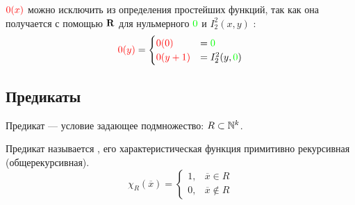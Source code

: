 \begin{note}
	$ {\color{red}0(x)}$ можно исключить из определения простейших функций, так как она получается с помощью $ \mathbf{R}$ для нульмерного $ {\color{green}0}$ и $ I^{2}_{2} (x, y)$ :
	\[
		{\color{red}0(y)} = 
		\begin{cases}
			{\color{red}0(0)} &= {\color{green}0} \\
			{\color{red}0(y+1)} &=I^{2}_{2} (y, {\color{green}0})
		\end{cases}
	\] 
\end{note}


\subsection{Предикаты}
\begin{defn}
	Предикат --- условие задающее подмножество: $ R \subset \mathbb{N}^{k}$.
	
	\noindent
	Предикат называется , его характеристическая функция примитивно рекурсивная (общерекурсивная).
\[
	\chi_{R}(\overline{x})= 
	\begin{cases}
		1, &\overline{x} \in  R \\
		0, &\overline{x} \notin R
	\end{cases}
\] 
\end{defn}


